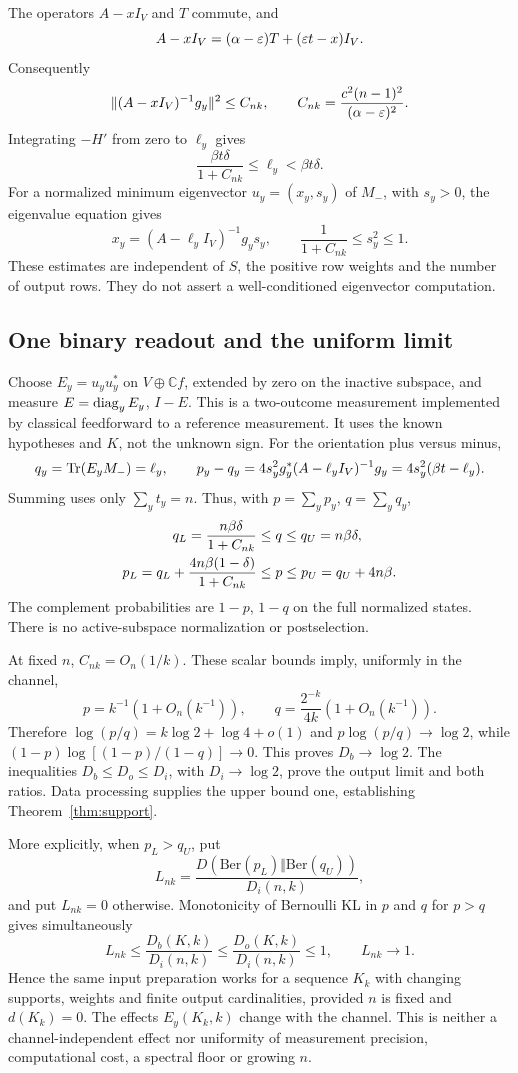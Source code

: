 The operators $A-xI_V$ and $T$ commute, and
\[
 A-xI_V=(\alpha-\varepsilon)T+(\varepsilon t-x)I_V.
\]
Consequently
\[
 \|(A-xI_V)^{-1}g_y\|^2\leq C_{nk},\qquad
 C_{nk}=\frac{c^2(n-1)^2}{(\alpha-\varepsilon)^2}.
\]
Integrating $-H'$ from zero to $\ell_y$ gives
\begin{equation}\label{eq:ell-bound}
 \frac{\beta t\delta}{1+C_{nk}}\leq\ell_y<\beta t\delta.
\end{equation}
For a normalized minimum eigenvector $u_y=(x_y,s_y)$ of $M_-$, with $s_y>0$, the eigenvalue equation gives
\[
 x_y=(A-\ell_y I_V)^{-1}g_y s_y,\qquad
 \frac1{1+C_{nk}}\leq s_y^2\leq1.
\]
These estimates are independent of $S$, the positive row weights and the number of output rows. They do not assert a well-conditioned eigenvector computation.

\subsection{One binary readout and the uniform limit}
Choose $E_y=u_yu_y^*$ on $V\oplus\mathbb Cf$, extended by zero on the inactive subspace, and measure $E=\operatorname{diag}_yE_y$, $I-E$. This is a two-outcome measurement implemented by classical feedforward to a reference measurement. It uses the known hypotheses and $K$, not the unknown sign. For the orientation plus versus minus,
\[
 q_y=\operatorname{Tr}(E_yM_-)=\ell_y,\qquad
 p_y-q_y=4s_y^2g_y^*(A-\ell_y I_V)^{-1}g_y
          =4s_y^2(\beta t-\ell_y).
\]
Summing uses only $\sum_yt_y=n$. Thus, with $p=\sum_yp_y$, $q=\sum_yq_y$,
\begin{align}\label{eq:uniform-pq}
 q_L=\frac{n\beta\delta}{1+C_{nk}}&\leq q\leq q_U=n\beta\delta,\\
 p_L=q_L+\frac{4n\beta(1-\delta)}{1+C_{nk}}
 &\leq p\leq p_U=q_U+4n\beta.\notag
\end{align}
The complement probabilities are $1-p$, $1-q$ on the full normalized states. There is no active-subspace normalization or postselection.

At fixed $n$, $C_{nk}=O_n(1/k)$. These scalar bounds imply, uniformly in the channel,
\[
 p=k^{-1}(1+O_n(k^{-1})),\qquad
 q=\frac{2^{-k}}{4k}(1+O_n(k^{-1})).
\]
Therefore $\log(p/q)=k\log2+\log4+o(1)$ and $p\log(p/q)\to\log2$, while $(1-p)\log[(1-p)/(1-q)]\to0$. This proves $D_b\to\log2$. The inequalities $D_b\leq D_o\leq D_i$, with $D_i\to\log2$, prove the output limit and both ratios. Data processing supplies the upper bound one, establishing Theorem~\ref{thm:support}.

More explicitly, when $p_L>q_U$, put
\[
 L_{nk}=\frac{D(\mathrm{Ber}(p_L)\Vert\mathrm{Ber}(q_U))}{D_i(n,k)},
\]
and put $L_{nk}=0$ otherwise. Monotonicity of Bernoulli KL in $p$ and $q$ for $p>q$ gives simultaneously
\[
 L_{nk}\leq\frac{D_b(K,k)}{D_i(n,k)}\leq
 \frac{D_o(K,k)}{D_i(n,k)}\leq1,\qquad L_{nk}\longrightarrow1.
\]
Hence the same input preparation works for a sequence $K_k$ with changing supports, weights and finite output cardinalities, provided $n$ is fixed and $d(K_k)=0$. The effects $E_y(K_k,k)$ change with the channel. This is neither a channel-independent effect nor uniformity of measurement precision, computational cost, a spectral floor or growing $n$.

